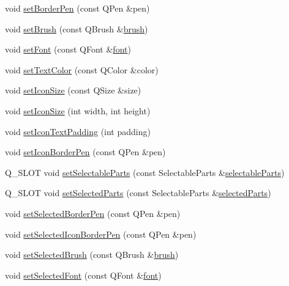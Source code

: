 \begin{DoxyCompactItemize}
\item 
void \hyperlink{class_q_c_p_legend_a866a9e3f5267de7430a6c7f26a61db9f}{set\+Border\+Pen} (const Q\+Pen \&pen)
\item 
void \hyperlink{class_q_c_p_legend_a497bbcd38baa3598c08e2b3f48103f23}{set\+Brush} (const Q\+Brush \&\hyperlink{class_q_c_p_legend_a7e5d2766e7d724f399022be8a4e8a2cb}{brush})
\item 
void \hyperlink{class_q_c_p_legend_aa4cda8499e3cb0f3be415edc02984c73}{set\+Font} (const Q\+Font \&\hyperlink{class_q_c_p_legend_a5cf8b840bc02f7bf4edb8dde400d0f41}{font})
\item 
void \hyperlink{class_q_c_p_legend_ae1eb239ff4a4632fe1b6c3e668d845c6}{set\+Text\+Color} (const Q\+Color \&color)
\item 
void \hyperlink{class_q_c_p_legend_a8b0740cce488bf7010da6beda6898984}{set\+Icon\+Size} (const Q\+Size \&size)
\item 
void \hyperlink{class_q_c_p_legend_a96b1a37fd4ee6a9778e6e54fe56ab6c2}{set\+Icon\+Size} (int width, int height)
\item 
void \hyperlink{class_q_c_p_legend_a62973bd69d5155e8ea3141366e8968f6}{set\+Icon\+Text\+Padding} (int padding)
\item 
void \hyperlink{class_q_c_p_legend_a2f2c93d18a651f4ff294bb3f026f49b8}{set\+Icon\+Border\+Pen} (const Q\+Pen \&pen)
\item 
Q\+\_\+\+S\+L\+O\+T void \hyperlink{class_q_c_p_legend_a9ce60aa8bbd89f62ae4fa83ac6c60110}{set\+Selectable\+Parts} (const Selectable\+Parts \&\hyperlink{class_q_c_p_legend_aa90c7fdbad7a0e93527bafb1f1f49a43}{selectable\+Parts})
\item 
Q\+\_\+\+S\+L\+O\+T void \hyperlink{class_q_c_p_legend_a2aee309bb5c2a794b1987f3fc97f8ad8}{set\+Selected\+Parts} (const Selectable\+Parts \&\hyperlink{class_q_c_p_legend_abbbf1b2d6a149013527ed87b0780894a}{selected\+Parts})
\item 
void \hyperlink{class_q_c_p_legend_a2c35d262953a25d96b6112653fbefc88}{set\+Selected\+Border\+Pen} (const Q\+Pen \&pen)
\item 
void \hyperlink{class_q_c_p_legend_ade93aabe9bcccaf9cf46cec22c658027}{set\+Selected\+Icon\+Border\+Pen} (const Q\+Pen \&pen)
\item 
void \hyperlink{class_q_c_p_legend_a875227f3219c9799464631dec5e8f1bd}{set\+Selected\+Brush} (const Q\+Brush \&\hyperlink{class_q_c_p_legend_a7e5d2766e7d724f399022be8a4e8a2cb}{brush})
\item 
void \hyperlink{class_q_c_p_legend_ab580a01c3c0a239374ed66c29edf5ad2}{set\+Selected\+Font} (const Q\+Font \&\hyperlink{class_q_c_p_legend_a5cf8b840bc02f7bf4edb8dde400d0f41}{font})

\end{DoxyCompactItemize}
